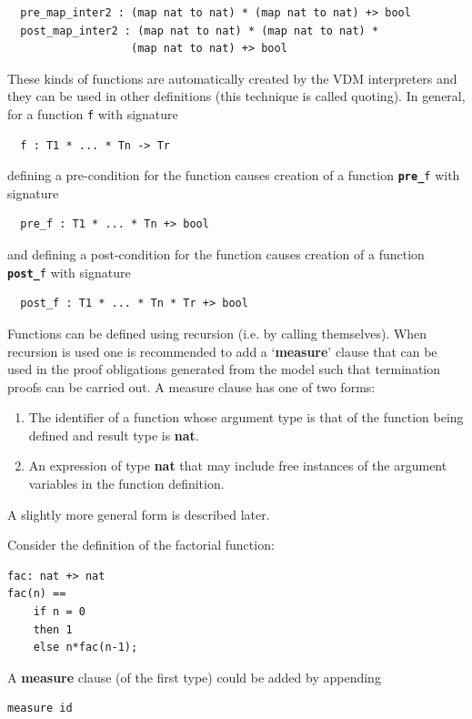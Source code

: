 \documentclass{overturerepchap}
\newcommand{\keyw}[1]{{\bf\ttfamily #1}}
\begin{document}
\begin{lstlisting}
  pre_map_inter2 : (map nat to nat) * (map nat to nat) +> bool
  post_map_inter2 : (map nat to nat) * (map nat to nat) *
                   (map nat to nat) +> bool
\end{lstlisting}
These kinds of functions are automatically created by the VDM
interpreters and they can be used in other definitions (this technique
is called quoting). In general, for a function \texttt{f} with
signature
\begin{lstlisting}
  f : T1 * ... * Tn -> Tr
\end{lstlisting}
defining a pre-condition for the function causes creation of a
function \texttt{\keyw{pre\_}f} with signature
\begin{lstlisting}
  pre_f : T1 * ... * Tn +> bool
\end{lstlisting}
and defining a post-condition for the function causes creation of a
function \texttt{\keyw{post\_}f} with signature
\begin{lstlisting}
  post_f : T1 * ... * Tn * Tr +> bool
\end{lstlisting}

Functions can be defined using recursion (i.e. by calling themselves). When recursion is used one is recommended to add a `\keyw{measure}' clause that can be used in the proof obligations generated from the model such that termination proofs can be carried out. A measure clause has one of two forms:

\begin{enumerate}
  \item The identifier of a function whose argument type is that of the function being defined and result type is \keyw{nat}.
  \item  An expression of type \keyw{nat} that may include free instances of the argument variables in the function definition.
\end{enumerate}

A slightly more general form is described later.

Consider the definition of the factorial function:

\begin{lstlisting}
fac: nat +> nat
fac(n) ==
    if n = 0
    then 1
    else n*fac(n-1);
\end{lstlisting}

A \keyw{measure} clause (of the first type) could be added by appending

\begin{lstlisting}
measure id
\end{lstlisting}
\end{document}
